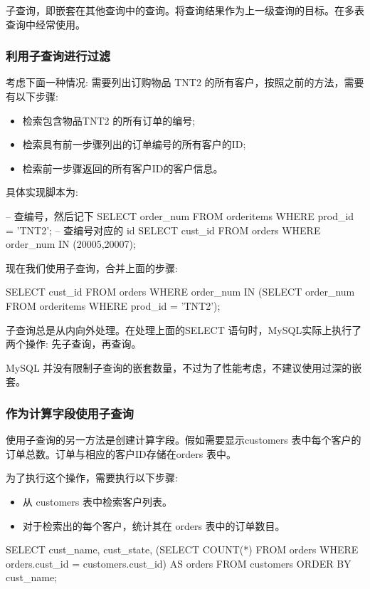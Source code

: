 子查询，即嵌套在其他查询中的查询。将查询结果作为上一级查询的目标。在多表查询中经常使用。

\subsubsection{利用子查询进行过滤}

考虑下面一种情况: 需要列出订购物品 TNT2 的所有客户，按照之前的方法，需要有以下步骤:
\begin{itemize}
    \item 检索包含物品TNT2 的所有订单的编号;
    \item 检索具有前一步骤列出的订单编号的所有客户的ID;
    \item 检索前一步骤返回的所有客户ID的客户信息。
\end{itemize}

具体实现脚本为:
\begin{sql}
-- 查编号，然后记下
SELECT order_num FROM orderitems WHERE prod_id = 'TNT2';
-- 查编号对应的 id
SELECT cust_id FROM orders WHERE order_num IN (20005,20007);
\end{sql}

现在我们使用子查询，合并上面的步骤:

\begin{sql}
SELECT cust_id FROM orders
    WHERE order_num IN (SELECT order_num 
                        FROM orderitems
                        WHERE prod_id = 'TNT2');
\end{sql}

子查询总是从内向外处理。在处理上面的SELECT 语句时，MySQL实际上执行了两个操作: 先子查询，再查询。

MySQL 并没有限制子查询的嵌套数量，不过为了性能考虑，不建议使用过深的嵌套。

\subsubsection{作为计算字段使用子查询}

使用子查询的另一方法是创建计算字段。假如需要显示customers 表中每个客户的订单总数。订单与相应的客户ID存储在orders 表中。

为了执行这个操作，需要执行以下步骤:
\begin{itemize}
    \item 从 customers 表中检索客户列表。
    \item 对于检索出的每个客户，统计其在 orders 表中的订单数目。
\end{itemize}

\begin{sql}
SELECT cust_name, cust_state,
    (SELECT COUNT(*) FROM orders WHERE orders.cust_id = customers.cust_id) AS orders
    FROM customers
    ORDER BY cust_name;
\end{sql}

